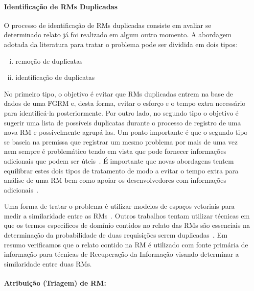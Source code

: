 \paragraph{Identificação de RMs Duplicadas} O processo de identificação de RMs
duplicadas consiste em avaliar se determinado relato já foi realizado em algum
outro momento. A abordagem adotada da literatura para tratar o problema pode ser
dividida em dois tipos\cite{kaushik2012comparative, tian2012improved}:

\begin{enumerate}[(i)]
	\item remoção de duplicatas
	\item identificação de duplicatas
\end{enumerate}

No primeiro tipo, o objetivo é evitar que RMs duplicadas entrem na base de dados
de uma FGRM e, desta forma, evitar o esforço e o tempo extra necessário para
identificá-la posteriormente. Por outro lado, no segundo tipo o objetivo é
sugerir uma lista de possíveis duplicatas durante o processo de registro de uma
nova RM e possivelmente agrupá-las. Um ponto importante é que o segundo tipo se
baseia na premissa que registrar um mesmo problema por mais de uma vez nem
sempre é problemático tendo em vista que pode fornecer informações adicionais
que podem ser úteis~\cite{bettenburg2008duplicate}. É importante que novas
abordagens tentem equilibrar estes dois tipos de tratamento de modo a evitar o
tempo extra para análise de uma RM bem como apoiar os desenvolvedores com
informações adicionais~\cite{Lerch:2013:FDY:2495256.2495763,Thung2014}.

Uma forma de tratar o problema é utilizar modelos de espaços vetoriais para
medir a similaridade entre as RMs~\cite{liu2014faceted, sun2010discriminative,
	Thung2014,tomavsev2013exploiting}. Outros trabalhos tentam utilizar técnicas
em que os termos específicos de domínio contidos no relato das RMs são
essenciais na determinação da probabilidade de duas requisições serem
duplicadas~\cite{hindle2016contextual, alipour2013contextual}.  Em resumo
verificamos que o relato contido na RM é utilizado com fonte primária de
informação para técnicas de Re\-cu\-pe\-ra\-ção da Informação visando determinar
a similaridade entre duas RMs.

\paragraph{Atribuição (Triagem) de RM:}

